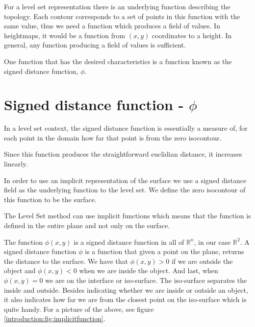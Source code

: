 

For a level set representation there is an underlying function
describing the topology. Each contour corresponds to a set of points
in this function with the same value, thus we need a function which
produces a field of values. In heightmaps, it would be a function from
$(x,y)$ coordinates to a height. In general, any function producing a
field of values is sufficient.  

One function that has the desired characteristics is a function known
as the signed distance function, $\phi$.

\section*{Signed distance function - $\phi$}

In a level set context, the signed distance function is essentially a
measure of, for each point in the domain how far that point is from
the zero isocontour.

Since this function produces the straightforward euclidian distance,
it increases linearly. 

In order to use an implicit representation of the surface we use a
signed distance field as the underlying function to the level set. We
define the zero isocontour of this function to be the surface.

The Level Set method can use implicit functions which means that the
function is defined in the entire plane and not only on the surface.

The function $\phi(x,y)$ is a signed distance function in all of
$\mathbb{R}^{n}$, in our case $\mathbb{R}^{2}$. A signed distance
function $\phi$ is a function that given a point on the plane, returns
the distance to the surface. We have that $\phi(x,y) > 0$ if we are
outside the object and $\phi(x,y) < 0$ when we are inside the object.
And last, when $\phi(x,y) = 0$ we are on the interface or iso-surface.
The iso-surface separates the inside and outside.  Besides indicating
whether we are inside or outside an object, it also indicates how far
we are from the closest point on the iso-surface which is quite
handy. For a picture of the above, see figure
\vref{introduction:fig:implicitfunction}.

